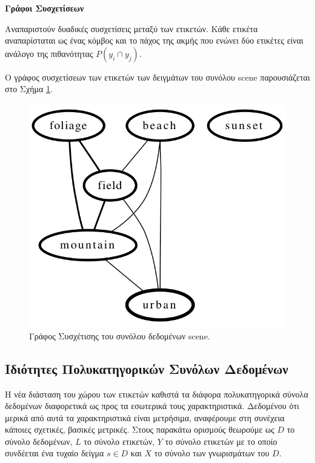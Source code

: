 \begin{description}
\item \textbf{Γράφοι Συσχετίσεων}

Αναπαριστούν δυαδικές συσχετίσεις μεταξύ των ετικετών. Κάθε ετικέτα αναπαρίσταται ως ένας κόμβος και το πάχος της ακμής που ενώνει δύο ετικέτες είναι ανάλογο της πιθανότητας $P(y_i \cap y_j)$. 

Ο γράφος συσχετίσεων των ετικετών των δειγμάτων του συνόλου scene παρουσιάζεται στο Σχήμα \ref{graph:sceneGraph}.


\begin{figure}[!htb]
 \begin{center}
    \includegraphics[scale=.3]{./images/sceneGraph.png}
  \caption{Γράφος Συσχέτισης του συνόλου δεδομένων scene.}
  \label{graph:sceneGraph}
 \end{center}
\end{figure}

\end{description}



\subsection{Ιδιότητες Πολυκατηγορικών Συνόλων Δεδομένων}
\label{subsec:mlDatasetsProperties}
Η νέα διάσταση του χώρου των ετικετών καθιστά τα διάφορα πολυκατηγορικά σύνολα δεδομένων διαφορετικά ως προς τα εσωτερικά τους χαρακτηριστικά. Δεδομένου ότι μερικά από αυτά τα χαρακτηριστικά είναι μετρήσιμα, αναφέρουμε στη συνέχεια κάποιες σχετικές, βασικές μετρικές. Στους παρακάτω ορισμούς θεωρούμε ως $D$ το σύνολο δεδομένων, $L$ το σύνολο ετικετών, $Y$ το σύνολο ετικετών με το οποίο συνδέεται ένα τυχαίο δείγμα $s \in D$ και $X$ το σύνολο των γνωρισμάτων του $D$.

